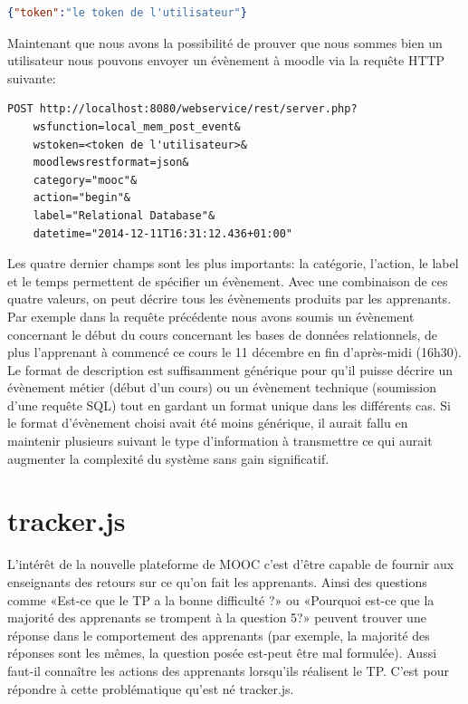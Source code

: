 \documentclass[a4paper,11pt]{report}
\begin{document}
\begin{lstlisting}[language=json, caption={Retourne le token}]
{"token":"le token de l'utilisateur"}
\end{lstlisting}

Maintenant que nous avons la possibilité de prouver que nous sommes bien un utilisateur nous pouvons envoyer un évènement à moodle via la requête HTTP suivante:

\begin{lstlisting}[caption={Soumet un évènement}]
POST http://localhost:8080/webservice/rest/server.php?
    wsfunction=local_mem_post_event&
    wstoken=<token de l'utilisateur>&
    moodlewsrestformat=json&
    category="mooc"&
    action="begin"&
    label="Relational Database"&
    datetime="2014-12-11T16:31:12.436+01:00"
\end{lstlisting}

Les quatre dernier champs sont les plus importants: la catégorie, l'action, le label et le temps permettent de spécifier un évènement. Avec une combinaison de ces quatre valeurs, on peut décrire tous les évènements produits par les apprenants. Par exemple dans la requête précédente nous avons soumis un évènement concernant le début du cours concernant les bases de données relationnels, de plus l'apprenant à commencé ce cours le 11 décembre en fin d'après-midi (16h30).
Le format de description est suffisamment générique pour qu'il puisse décrire un évènement métier (début d'un cours) ou un évènement technique (soumission d'une requête SQL) tout en gardant un format unique dans les différents cas. Si le format d'évènement choisi avait été moins générique, il aurait fallu en maintenir plusieurs suivant le type d'information à transmettre ce qui aurait augmenter la complexité du système sans gain significatif.

\section{tracker.js}

L'intérêt de la nouvelle plateforme de MOOC c'est d'être capable de fournir aux enseignants des retours sur ce qu'on fait les apprenants. Ainsi des questions comme «Est-ce que le TP a la bonne difficulté ?» ou «Pourquoi est-ce que la majorité des apprenants se trompent à la question 5?» peuvent trouver une réponse dans le comportement des apprenants (par exemple, la majorité des réponses sont les mêmes, la question posée est-peut être mal formulée). Aussi faut-il connaître les actions des apprenants lorsqu'ils réalisent le TP.
C'est pour répondre à cette problématique qu'est né tracker.js.
\end{document}

